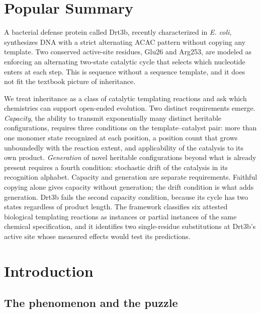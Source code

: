 \documentclass[aps,prx,reprint,amsmath,amssymb,floatfix,superscriptaddress,nofootinbib]{revtex4-2}
\theoremstyle{plain-thm}
\theoremstyle{definition-thm}
\begin{document}
\maketitle

\section*{Popular Summary}

A bacterial defense protein called Drt3b, recently characterized in \emph{E. coli}, synthesizes DNA with a strict alternating ACAC pattern without copying any template. Two conserved active-site residues, Glu26 and Arg253, are modeled as enforcing an alternating two-state catalytic cycle that selects which nucleotide enters at each step. This is sequence without a sequence template, and it does not fit the textbook picture of inheritance.

We treat inheritance as a class of catalytic templating reactions and ask which chemistries can support open-ended evolution. Two distinct requirements emerge. \emph{Capacity}, the ability to transmit exponentially many distinct heritable configurations, requires three conditions on the template--catalyst pair: more than one monomer state recognized at each position, a position count that grows unboundedly with the reaction extent, and applicability of the catalysis to its own product. \emph{Generation} of novel heritable configurations beyond what is already present requires a fourth condition: stochastic drift of the catalysis in its recognition alphabet. Capacity and generation are separate requirements. Faithful copying alone gives capacity without generation; the drift condition is what adds generation. Drt3b fails the second capacity condition, because its cycle has two states regardless of product length. The framework classifies six attested biological templating reactions as instances or partial instances of the same chemical specification, and it identifies two single-residue substitutions at Drt3b's active site whose measured effects would test its predictions.


\section{Introduction}

\subsection{The phenomenon and the puzzle}
\end{document}
